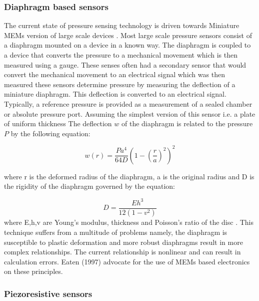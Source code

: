 \subsubsection{Diaphragm based sensors}

The current state of pressure sensing technology is driven towards Miniature MEMs version of large scale devices \cite{eaton1997micromachined}. Most large scale pressure sensors consist of a diaphragm mounted on a device in a known way. The diaphragm is coupled to a device that converts the pressure to a mechanical movement which is then measured using a gauge. These senses often had a secondary sensor that would convert the mechanical movement to an electrical signal which was then measured \cite{eaton1997micromachined} these sensors determine pressure by measuring the deflection of a miniature diaphragm. This deflection is converted to an electrical signal. Typically, a reference pressure is provided as a measurement of a sealed chamber or absolute pressure port. Assuming the simplest version of this sensor i.e. a plate of uniform thickness \cite{eaton1997micromachined} The deflection $w$ of the diaphragm is related to the pressure  $P$ by the following equation: \cite{eaton1997micromachined}

\begin{equation}
	w(r) = \frac{Pa^4}{64D}(1- (\frac{r}{a})^2)^2
\end{equation}

where r is the deformed radius of the diaphragm, a is the original radius and D is the  rigidity of the diaphragm governed by the equation:

\begin{equation}
	D = \frac{Eh^3}{12(1-v^2)}
\end{equation}
where E,h,v are Young's modulus, thickness and Poisson's ratio of the disc \cite{eaton1997micromachined}. This technique suffers from a multitude of problems namely, the diaphragm is susceptible to plastic deformation and more robust diaphragms result in more complex relationships. The current relationship is nonlinear and can result in calculation errors. Eaten (1997) advocate for the use of MEMs based electronics on these principles.

\subsubsection{Piezoresistive sensors}

